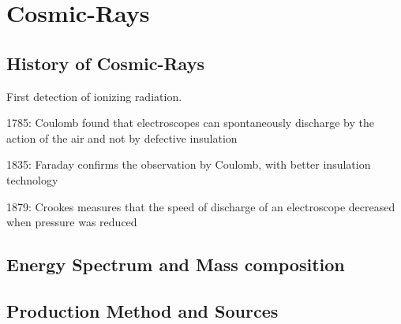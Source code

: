 \chapter{Cosmic-Rays}\label{Ch:Cosmic-rays}

\section{History of Cosmic-Rays}

First detection of ionizing radiation. 

1785: Coulomb found that 
electroscopes can spontaneously 
discharge by the action of the air 
and not by defective insulation

1835: Faraday confirms the 
observation by Coulomb, with 
better insulation technology

1879: Crookes measures that the 
speed of discharge of an 
electroscope decreased when 
pressure was reduced 

\section{Energy Spectrum and Mass composition}

\section{Production Method and Sources}